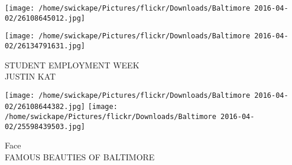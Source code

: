 \documentclass[10pt,letterpaper]{article}
\begin{document}
\texttt{[image: /home/swickape/Pictures/flickr/Downloads/Baltimore 2016-04-02/26108645012.jpg]}

\vspace{0.25in}
\texttt{[image: /home/swickape/Pictures/flickr/Downloads/Baltimore 2016-04-02/26134791631.jpg]}

STUDENT EMPLOYMENT WEEK\\
JUSTIN KAT
\pagebreak

\texttt{[image: /home/swickape/Pictures/flickr/Downloads/Baltimore 2016-04-02/26108644382.jpg]}
\texttt{[image: /home/swickape/Pictures/flickr/Downloads/Baltimore 2016-04-02/25598439503.jpg]}

Face\\
FAMOUS BEAUTIES OF BALTIMORE
\pagebreak
\end{document}
